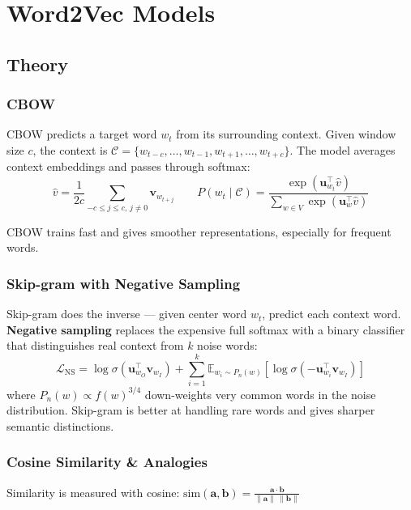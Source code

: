 \documentclass[11pt,a4paper]{article}
\begin{document}
\section{Word2Vec Models}

\subsection{Theory}

\subsubsection{CBOW}

CBOW predicts a target word $w_t$ from its surrounding context. Given window size $c$, the context is $\mathcal{C} = \{w_{t-c},\ldots,w_{t-1},w_{t+1},\ldots,w_{t+c}\}$. The model averages context embeddings and passes through softmax:
\[
  \hat{v} = \frac{1}{2c}\sum_{-c \le j \le c,\, j \ne 0} \mathbf{v}_{w_{t+j}} \qquad
  P(w_t \mid \mathcal{C}) = \frac{\exp(\mathbf{u}_{w_t}^\top \hat{v})}{\sum_{w \in V} \exp(\mathbf{u}_w^\top \hat{v})}
\]

CBOW trains fast and gives smoother representations, especially for frequent words.

\subsubsection{Skip-gram with Negative Sampling}

Skip-gram does the inverse --- given center word $w_t$, predict each context word. \textbf{Negative sampling} replaces the expensive full softmax with a binary classifier that distinguishes real context from $k$ noise words:
\[
  \mathcal{L}_{\text{NS}} = \log \sigma(\mathbf{u}_{w_O}^\top \mathbf{v}_{w_I})
  + \sum_{i=1}^{k} \mathbb{E}_{w_i \sim P_n(w)}\!\left[\log \sigma(-\mathbf{u}_{w_i}^\top \mathbf{v}_{w_I})\right]
\]
where $P_n(w) \propto f(w)^{3/4}$ down-weights very common words in the noise distribution. Skip-gram is better at handling rare words and gives sharper semantic distinctions.

\subsubsection{Cosine Similarity \& Analogies}

Similarity is measured with cosine: $\text{sim}(\mathbf{a}, \mathbf{b}) = \frac{\mathbf{a} \cdot \mathbf{b}}{\|\mathbf{a}\|\,\|\mathbf{b}\|}$
\end{document}
